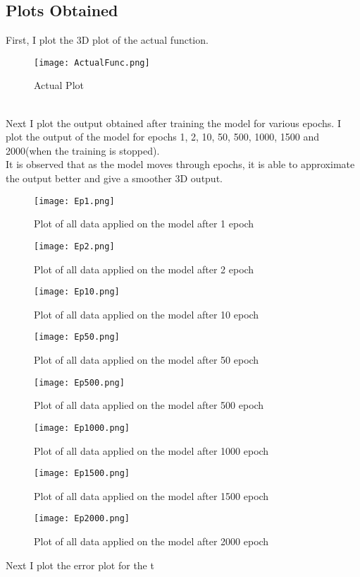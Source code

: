 \documentclass{article}
\begin{document}
\subsection{Plots Obtained}
First, I plot the 3D plot of the actual function.
\begin{figure}[htbp]
    \centering
    \texttt{[image: ActualFunc.png]}
    \captionsetup{justification=centering}
    \caption{Actual Plot}
\end{figure}
\\Next I plot the output obtained after training the model for various epochs. I plot the output of the model for epochs 1, 2, 10, 50, 500, 1000, 1500 and 2000(when the training is stopped).\\
It is observed that as the model moves through epochs, it is able to approximate the output better and give a smoother 3D output.
\begin{figure}[htbp]
    \centering
    \texttt{[image: Ep1.png]}
    \captionsetup{justification=centering}
    \caption{Plot of all data applied on the model after 1 epoch}
\end{figure}
\begin{figure}[htbp]
    \centering
    \texttt{[image: Ep2.png]}
    \captionsetup{justification=centering}
    \caption{Plot of all data applied on the model after 2 epoch}
\end{figure}
\begin{figure}[htbp]
    \centering
    \texttt{[image: Ep10.png]}
    \captionsetup{justification=centering}
    \caption{Plot of all data applied on the model after 10 epoch}
\end{figure}
\begin{figure}[htbp]
    \centering
    \texttt{[image: Ep50.png]}
    \captionsetup{justification=centering}
    \caption{Plot of all data applied on the model after 50 epoch}
\end{figure}
\begin{figure}[htbp]
    \centering
    \texttt{[image: Ep500.png]}
    \captionsetup{justification=centering}
    \caption{Plot of all data applied on the model after 500 epoch}
\end{figure}
\begin{figure}[htbp]
    \centering
    \texttt{[image: Ep1000.png]}
    \captionsetup{justification=centering}
    \caption{Plot of all data applied on the model after 1000 epoch}
\end{figure}
\begin{figure}[htbp]
    \centering
    \texttt{[image: Ep1500.png]}
    \captionsetup{justification=centering}
    \caption{Plot of all data applied on the model after 1500 epoch}
\end{figure}
\begin{figure}[htbp]
    \centering
    \texttt{[image: Ep2000.png]}
    \captionsetup{justification=centering}
    \caption{Plot of all data applied on the model after 2000 epoch}
\end{figure}
\newpage
Next I plot the error plot for the t
\end{document}
